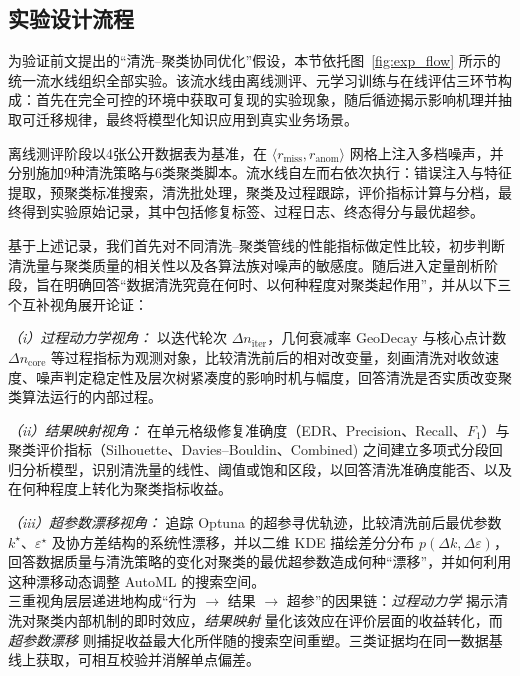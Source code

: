 \documentclass[10pt]{article} %
\numberwithin{equation}{section}
\begin{document}
\subsection{\textcolor[rgb]{0.00,0.07,1.00}{实验设计流程}}\label{sec:exp_pipeline}

为验证前文提出的“清洗–聚类协同优化”假设，本节依托图~\ref{fig:exp_flow} 所示的统一流水线组织全部实验。该流水线由离线测评、元学习训练与在线评估三环节构成：首先在完全可控的环境中获取可复现的实验现象，随后循迹揭示影响机理并抽取可迁移规律，最终将模型化知识应用到真实业务场景。

离线测评阶段以4张公开数据表为基准，在 \(\langle r_{\text{miss}},r_{\text{anom}}\rangle\) 网格上注入多档噪声，并分别施加9种清洗策略与6类聚类脚本。流水线自左而右依次执行：错误注入与特征提取，预聚类标准搜索，清洗批处理，聚类及过程跟踪，评价指标计算与分档，最终得到实验原始记录，其中包括修复标签、过程日志、终态得分与最优超参。

基于上述记录，我们首先对不同清洗–聚类管线的性能指标做定性比较，初步判断清洗量与聚类质量的相关性以及各算法族对噪声的敏感度。随后进入定量剖析阶段，旨在明确回答“数据清洗究竟在何时、以何种程度对聚类起作用”，并从以下三个互补视角展开论证：

\emph{（i）过程动力学视角：} 以迭代轮次 \(\Delta n_{\text{iter}}\)，几何衰减率 \(\text{GeoDecay}\) 与核心点计数 \(\Delta n_{\text{core}}\) 等过程指标为观测对象，比较清洗前后的相对改变量，刻画清洗对收敛速度、噪声判定稳定性及层次树紧凑度的影响时机与幅度，回答清洗是否实质改变聚类算法运行的内部过程。

\emph{（ii）结果映射视角：} 在单元格级修复准确度（EDR、Precision、Recall、\(F_1\)）与聚类评价指标（Silhouette、Davies–Bouldin、Combined) 之间建立多项式分段回归分析模型，识别清洗量的线性、阈值或饱和区段，以回答清洗准确度能否、以及在何种程度上转化为聚类指标收益。

\emph{（iii）超参数漂移视角：} 追踪 Optuna 的超参寻优轨迹，比较清洗前后最优参数 \(k^\star\)、\(\varepsilon^\star\) 及协方差结构的系统性漂移，并以二维 KDE 描绘差分分布 \(p(\Delta k,\Delta\varepsilon)\)，回答数据质量与清洗策略的变化对聚类的最优超参数造成何种“漂移”，并如何利用这种漂移动态调整 AutoML 的搜索空间。\\
三重视角层层递进地构成“行为 $\rightarrow$ 结果 $\rightarrow$ 超参”的因果链：\emph{过程动力学} 揭示清洗对聚类内部机制的即时效应，\emph{结果映射} 量化该效应在评价层面的收益转化，而 \emph{超参数漂移} 则捕捉收益最大化所伴随的搜索空间重塑。三类证据均在同一数据基线上获取，可相互校验并消解单点偏差。
\end{document}
